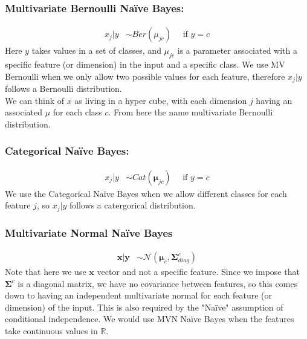 \documentclass{article}
\renewcommand{\v}{\boldsymbol}
\begin{document}
    \subsubsection{Multivariate Bernoulli Na\"ive Bayes:}
        \begin{align}
            x_j|y &\sim Ber(\mu_{jc}) ~~~~~~\text{if $y=c$}
        \end{align}
        Here $y$ takes values in a set of classes, and $\mu_{jc}$ is a parameter associated with a specific feature (or dimension) in the input and a specific class. We use MV Bernoulli when we only allow two possible values for each feature, therefore $x_j|y$ follows a Bernoulli distribution.\\
        We can think of $x$ as living in a hyper cube, with each dimension $j$ having an associated $\mu$ for each class $c$. From here the name multivariate Bernoulli distribution. 
    
    \subsubsection{Categorical Na\"ive Bayes:}
        \begin{align}
            x_j|y &\sim Cat(\v \mu_{jc}) ~~~~~~\text{if $y=c$}
        \end{align}
        We use the Categorical Na\"ive Bayes when we allow different classes for each feature $j$, so $x_j|y$ follows a catergorical distribution.
        
    \subsubsection{Multivariate Normal Na\"ive Bayes}
        \begin{align}
            \v x| \v y &\sim \mathcal{N}(\v \mu_c, \v \Sigma_{diag}^c)
        \end{align}    
        Note that here we use $\v x$ vector and not a specific feature. Since we impose that $\v \Sigma^c$ is a diagonal matrix, we have no covariance between features, so this comes down to having an independent multivariate normal for each feature (or dimension) of the input. This is also required by the "Na\"ive" assumption of conditional independence. We would use  MVN Na\"ive Bayes when the features take continuous values in $\mathbb{R}$. 
        
\end{document}
